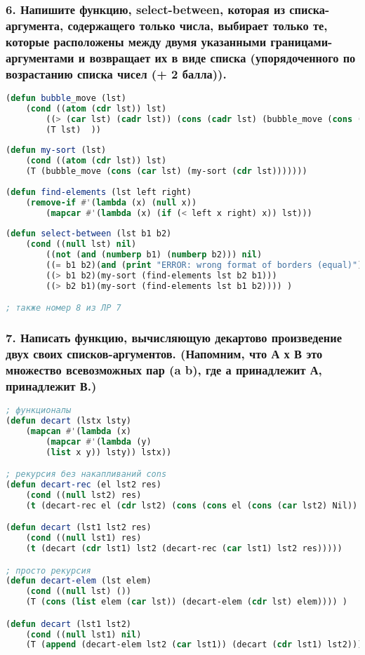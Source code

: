 \subsubsection*{6. Напишите функцию, select-between, которая из списка-аргумента, содержащего только числа, выбирает только те, которые расположены между двумя указанными границами-аргументами и возвращает их в виде списка (упорядоченного по возрастанию списка чисел (+ 2 балла)).}
\begin{lstlisting}[language=Lisp]
(defun bubble_move (lst)
	(cond ((atom (cdr lst)) lst)
		((> (car lst) (cadr lst)) (cons (cadr lst) (bubble_move (cons (car lst) (cddr lst)))))
		(T lst)  ))
		
(defun my-sort (lst)
	(cond ((atom (cdr lst)) lst)
	(T (bubble_move (cons (car lst) (my-sort (cdr lst)))))))
	
(defun find-elements (lst left right)
	(remove-if #'(lambda (x) (null x))
		(mapcar #'(lambda (x) (if (< left x right) x)) lst)))
		
(defun select-between (lst b1 b2)
	(cond ((null lst) nil)
		((not (and (numberp b1) (numberp b2))) nil)
		((= b1 b2)(and (print "ERROR: wrong format of borders (equal)") nil))
		((> b1 b2)(my-sort (find-elements lst b2 b1)))
		((> b2 b1)(my-sort (find-elements lst b1 b2))))	)

; также номер 8 из ЛР 7
\end{lstlisting}

\newpage
\subsubsection*{7. Написать функцию, вычисляющую декартово произведение двух своих списков-аргументов. (Напомним, что А х В это множество всевозможных пар (a b), где а принадлежит А, принадлежит В.)}
\begin{lstlisting}[language=Lisp]
; функционалы
(defun decart (lstx lsty)
	(mapcan #'(lambda (x)
		(mapcar #'(lambda (y)
		(list x y)) lsty)) lstx))

; рекурсия без накапливаний cons
(defun decart-rec (el lst2 res)
	(cond ((null lst2) res)
	(t (decart-rec el (cdr lst2) (cons (cons el (cons (car lst2) Nil)) res) ))))

(defun decart (lst1 lst2 res)
	(cond ((null lst1) res)
	(t (decart (cdr lst1) lst2 (decart-rec (car lst1) lst2 res)))))

; просто рекурсия 
(defun decart-elem (lst elem)
	(cond ((null lst) ())
	(T (cons (list elem (car lst)) (decart-elem (cdr lst) elem)))) )

(defun decart (lst1 lst2)
	(cond ((null lst1) nil)
	(T (append (decart-elem lst2 (car lst1)) (decart (cdr lst1) lst2)))) )

\end{lstlisting}

